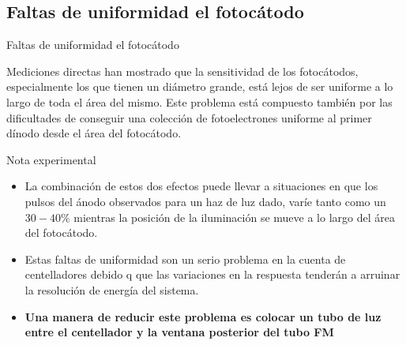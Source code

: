 \documentclass[a4paper,10pt]{beamer}
\begin{document}
\subsection{Faltas de uniformidad el fotocátodo}
\begin{frame}{Faltas de uniformidad el fotocátodo}

\begin{justify}
 
 Mediciones directas han mostrado que la sensitividad de los fotocátodos, especialmente 
 los que tienen un diámetro grande, está lejos de ser uniforme a lo largo de toda el 
 área del mismo. Este problema está compuesto también por las dificultades de conseguir 
 una colección de fotoelectrones uniforme al primer dínodo desde el área del fotocátodo.
 
 \begin{exampleblock}{Nota experimental}
  \begin{itemize}[<+->]
   \item \begin{justify}
	La combinación de estos dos efectos puede llevar a situaciones en que los pulsos 
	del ánodo observados para un haz de luz dado, varíe tanto como un $30-40\%$ mientras 
	la posición de la iluminación se mueve a lo largo del área del fotocátodo.
	 \end{justify}
   \item \begin{justify}
	Estas faltas de uniformidad son un serio problema en la cuenta de centelladores
	debido q que las variaciones en la respuesta tenderán a arruinar la resolución 
	de energía del sistema. 
	 \end{justify}
  \item \begin{justify}
	\textbf{Una manera de reducir este problema es colocar un tubo de luz entre 
	el centellador y la ventana posterior del tubo FM}
	 \end{justify}
  \end{itemize}
 \end{exampleblock}

\end{justify}
\end{frame}
\end{document}
